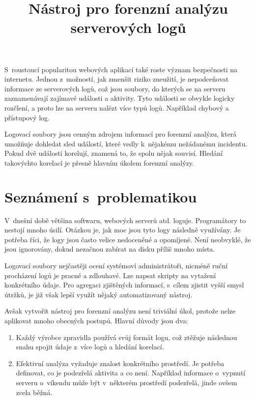 \documentclass[thesis=B,czech]{FITthesis}[2012/06/26]
\title{Nástroj pro forenzní analýzu serverových logů}
\begin{document}

\begin{introduction}
	S~roustoucí popularitou webových aplikací také roste význam bezpečnosti na internetu. Jednou z~možností, jak zmenšit riziko zneužití, je nepodceňovat informace ze serverových logů, což jsou soubory, do kterých se na serveru zaznamenávají zajímavé události a aktivity. Tyto události se obvykle logicky rozčlení, a proto lze na serveru nalézt více typů logů. Například chybový a přístupový log.
	
Logovací soubory jsou cenným zdrojem informací pro forenzní analýzu, která umožňuje dohledat sled událostí, které vedly k~nějakému nežádanému incidentu. Pokud dvě události korelují, znamená to, že spolu nějak souvisí. Hledání takovýchto korelací je přesně hlavním úkolem forenzní analýzy.
	
\section{Seznámení s~problematikou}
	V~dnešní době většina softwaru, webových serverů atd. loguje. Programátory to nestojí mnoho úsilí. Otázkou je, jak moc jsou tyto logy následně využívány. Je potřeba říci, že logy jsou často velice nedoceněné a opomíjené. Není neobvyklé, že jsou ignorovány, dokud nezačnou zabírat na disku příliš mnoho místa. \cite{logManagement}
	
Logovací soubory nejčastěji ocení systémoví administrátoři, nicméně ruční procházení logů je pracné a zdlouhavé. Lze napsat skripty na vytažení konkrétního údaje. Pro agregaci zjištěných informací, s~cílem zjistit vyšší smysl útržků, je již však lepší využít nějaký automatizovaný nástroj.

Avšak vytvořit nástroj pro forenzní analýzu není triviální úkol, protože nelze aplikovat mnoho obecných postupů. Hlavní důvody jsou dva:
\newpage
		\begin{enumerate}
			\item Každý výrobce zpravidla používá svůj formát logu, což ztěžuje následnou snahu spojit údaje z~více logů a hledání korelací.
			\item Efektivní analýza vyžaduje znalost konkrétního prostředí. Je potřeba definovat, co je podezřelá aktivita a co není. Například informace o~vypnutí serveru o~víkendu může být v~některém prostředí podezřelá, jinde ovšem zcela běžná.
		\end{enumerate}	
	


\end{introduction}
\end{document}

